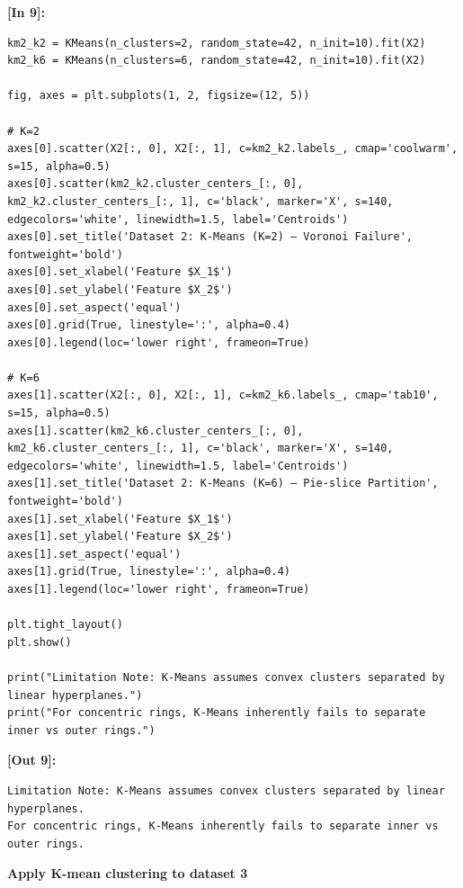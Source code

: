\vspace{0.4em}
\noindent\textbf{\small [In 9]:}
\begin{lstlisting}[style=pycode]
km2_k2 = KMeans(n_clusters=2, random_state=42, n_init=10).fit(X2)
km2_k6 = KMeans(n_clusters=6, random_state=42, n_init=10).fit(X2)

fig, axes = plt.subplots(1, 2, figsize=(12, 5))

# K=2
axes[0].scatter(X2[:, 0], X2[:, 1], c=km2_k2.labels_, cmap='coolwarm', s=15, alpha=0.5)
axes[0].scatter(km2_k2.cluster_centers_[:, 0], km2_k2.cluster_centers_[:, 1], c='black', marker='X', s=140, edgecolors='white', linewidth=1.5, label='Centroids')
axes[0].set_title('Dataset 2: K-Means (K=2) — Voronoi Failure', fontweight='bold')
axes[0].set_xlabel('Feature $X_1$')
axes[0].set_ylabel('Feature $X_2$')
axes[0].set_aspect('equal')
axes[0].grid(True, linestyle=':', alpha=0.4)
axes[0].legend(loc='lower right', frameon=True)

# K=6
axes[1].scatter(X2[:, 0], X2[:, 1], c=km2_k6.labels_, cmap='tab10', s=15, alpha=0.5)
axes[1].scatter(km2_k6.cluster_centers_[:, 0], km2_k6.cluster_centers_[:, 1], c='black', marker='X', s=140, edgecolors='white', linewidth=1.5, label='Centroids')
axes[1].set_title('Dataset 2: K-Means (K=6) — Pie-slice Partition', fontweight='bold')
axes[1].set_xlabel('Feature $X_1$')
axes[1].set_ylabel('Feature $X_2$')
axes[1].set_aspect('equal')
axes[1].grid(True, linestyle=':', alpha=0.4)
axes[1].legend(loc='lower right', frameon=True)

plt.tight_layout()
plt.show()

print("Limitation Note: K-Means assumes convex clusters separated by linear hyperplanes.")
print("For concentric rings, K-Means inherently fails to separate inner vs outer rings.")
\end{lstlisting}
\noindent\textbf{\small [Out 9]:}
\begin{lstlisting}[style=output]
Limitation Note: K-Means assumes convex clusters separated by linear hyperplanes.
For concentric rings, K-Means inherently fails to separate inner vs outer rings.
\end{lstlisting}

\vspace{0.3em}
\begin{tcolorbox}[colback=gray!5!white,colframe=gray!50!black,boxrule=0.5pt,arc=2pt,left=4pt,right=4pt,top=2pt,bottom=2pt,unbreakable,before upper={\sloppy\raggedright}]
{\small\bfseries Apply K-mean clustering to dataset 3\par}
\end{tcolorbox}

